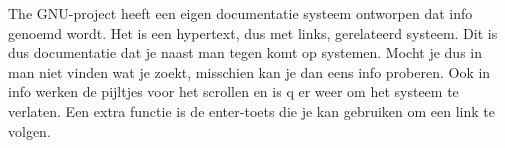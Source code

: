 The GNU-project heeft een eigen documentatie systeem ontworpen dat info genoemd wordt. Het is
een hypertext, dus met links, gerelateerd systeem. Dit is dus documentatie dat je naast man tegen komt op systemen.
Mocht je dus in man niet vinden wat je zoekt, misschien kan je dan eens info proberen. Ook in info werken de pijltjes
voor het scrollen en is q er weer om het systeem te verlaten. Een extra functie is de enter-toets die je kan gebruiken
om een link te volgen.
